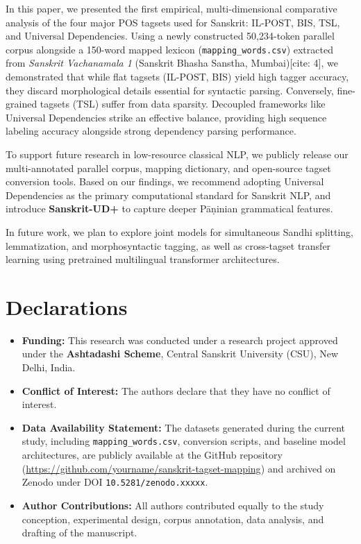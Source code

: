 \documentclass[11pt,a4paper]{article}
\begin{document}
In this paper, we presented the first empirical, multi-dimensional comparative analysis of the four major POS tagsets used for Sanskrit: IL-POST, BIS, TSL, and Universal Dependencies. Using a newly constructed 50,234-token parallel corpus alongside a 150-word mapped lexicon (\texttt{mapping\_words.csv}) extracted from \textit{Sanskrit Vachanamala 1} (Sanskrit Bhasha Sanstha, Mumbai)[cite: 4], we demonstrated that while flat tagsets (IL-POST, BIS) yield high tagger accuracy, they discard morphological details essential for syntactic parsing. Conversely, fine-grained tagsets (TSL) suffer from data sparsity. Decoupled frameworks like Universal Dependencies strike an effective balance, providing high sequence labeling accuracy alongside strong dependency parsing performance.

To support future research in low-resource classical NLP, we publicly release our multi-annotated parallel corpus, mapping dictionary, and open-source tagset conversion tools. Based on our findings, we recommend adopting Universal Dependencies as the primary computational standard for Sanskrit NLP, and introduce \textbf{Sanskrit-UD+} to capture deeper P\=a\d{n}inian grammatical features.

In future work, we plan to explore joint models for simultaneous Sandhi splitting, lemmatization, and morphosyntactic tagging, as well as cross-tagset transfer learning using pretrained multilingual transformer architectures.

\section*{Declarations}
\begin{itemize}[leftmargin=1.5em, itemsep=0.2em]
    \item \textbf{Funding:} This research was conducted under a research project approved under the \textbf{Ashtadashi Scheme}, Central Sanskrit University (CSU), New Delhi, India.
    \item \textbf{Conflict of Interest:} The authors declare that they have no conflict of interest.
    \item \textbf{Data Availability Statement:} The datasets generated during the current study, including \texttt{mapping\_words.csv}, conversion scripts, and baseline model architectures, are publicly available at the GitHub repository (\url{https://github.com/yourname/sanskrit-tagset-mapping}) and archived on Zenodo under DOI \texttt{10.5281/zenodo.xxxxx}.
    \item \textbf{Author Contributions:} All authors contributed equally to the study conception, experimental design, corpus annotation, data analysis, and drafting of the manuscript.
\end{itemize}
\end{document}
